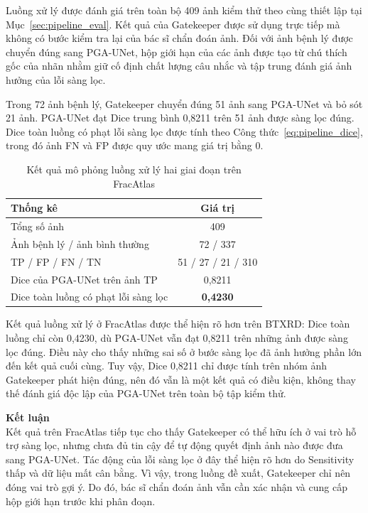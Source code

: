 Luồng xử lý được đánh giá trên toàn bộ 409 ảnh kiểm thử theo cùng thiết lập tại Mục~\ref{sec:pipeline_eval}. Kết quả của Gatekeeper được sử dụng trực tiếp mà không có bước kiểm tra lại của bác sĩ chẩn đoán ảnh. Đối với ảnh bệnh lý được chuyển đúng sang PGA-UNet, hộp giới hạn của các ảnh được tạo từ chú thích gốc của nhãn nhằm giữ cố định chất lượng câu nhắc và tập trung đánh giá ảnh hưởng của lỗi sàng lọc.

Trong 72 ảnh bệnh lý, Gatekeeper chuyển đúng 51 ảnh sang PGA-UNet và bỏ sót 21 ảnh. PGA-UNet đạt Dice trung bình 0,8211 trên 51 ảnh được sàng lọc đúng. Dice toàn luồng có phạt lỗi sàng lọc được tính theo Công thức~\ref{eq:pipeline_dice}, trong đó ảnh FN và FP được quy ước mang giá trị bằng 0.

\begin{table}[htbp]
    \centering
    \caption{Kết quả mô phỏng luồng xử lý hai giai đoạn trên FracAtlas}
    \label{tab:pipeline_eval_fa}
    \renewcommand{\arraystretch}{1.3}
    \begin{tabular}{|p{9cm}|c|}
        \hline
        \textbf{Thống kê} & \textbf{Giá trị} \\
        \hline
        Tổng số ảnh & 409 \\
        \hline
        Ảnh bệnh lý / ảnh bình thường & 72 / 337 \\
        \hline
        TP / FP / FN / TN & 51 / 27 / 21 / 310 \\
        \hline
        Dice của PGA-UNet trên ảnh TP & 0,8211 \\
        \hline
        Dice toàn luồng có phạt lỗi sàng lọc & \textbf{0,4230} \\
        \hline
    \end{tabular}
\end{table}

Kết quả luồng xử lý ở FracAtlas được thể hiện rõ hơn trên BTXRD: Dice toàn luồng chỉ còn 0,4230, dù PGA-UNet vẫn đạt 0,8211 trên những ảnh được sàng lọc đúng. Điều này cho thấy những sai số ở bước sàng lọc đã ảnh hưởng phần lớn đến kết quả cuối cùng. Tuy vậy, Dice 0,8211 chỉ được tính trên nhóm ảnh Gatekeeper phát hiện đúng, nên đó vẫn là một kết quả có điều kiện, không thay thế đánh giá độc lập của PGA-UNet trên toàn bộ tập kiểm thử.

\newpage
\noindent\textbf{Kết luận}\\
Kết quả trên FracAtlas tiếp tục cho thấy Gatekeeper có thể hữu ích ở vai trò hỗ trợ sàng lọc, nhưng chưa đủ tin cậy để tự động quyết định ảnh nào được đưa sang PGA-UNet. Tác động của lỗi sàng lọc ở đây thể hiện rõ hơn do Sensitivity thấp và dữ liệu mất cân bằng. Vì vậy, trong luồng đề xuất, Gatekeeper chỉ nên đóng vai trò gợi ý. Do đó, bác sĩ chẩn đoán ảnh vẫn cần xác nhận và cung cấp hộp giới hạn trước khi phân đoạn.
